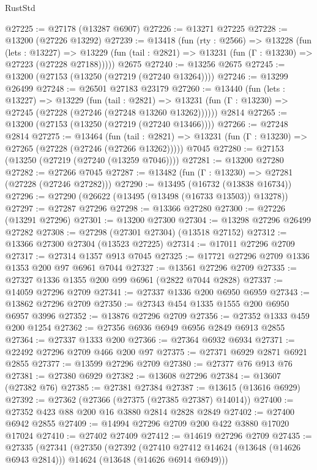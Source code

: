 \begin{lexlean}{RustStd}
\begin{coremodule}
@27225 := @27178 (@13287 @6907)
@27226 := @13271 @27225
@27228 := @13200 (@27226 @13292)
@27239 := @13418
    (fun (rty : @2566) =>
    @13228
      (fun (lets : @13227) =>
      @13229 (fun (tail : @2821) => @13231 (fun (Γ : @13230) => @27223 (@27228 @27188)))))
    @2675
@27240 := @13256 @2675
@27245 := @13200 (@27153 (@13250 (@27219 (@27240 @13264))))
@27246 := @13299 @26499
@27248 := @26501 @27183 @23179
@27260 := @13440
    (fun (lets : @13227) =>
    @13229
      (fun (tail : @2821) =>
      @13231 (fun (Γ : @13230) => @27245 (@27228 (@27246 (@27248 @13260 @13262))))))
    @2814
@27265 := @13200 (@27153 (@13250 (@27219 (@27240 @13466))))
@27266 := @27248 @2814
@27275 := @13464
    (fun (tail : @2821) => @13231 (fun (Γ : @13230) => @27265 (@27228 (@27246 (@27266 @13262)))))
    @7045
@27280 := @27153 (@13250 (@27219 (@27240 (@13259 @7046))))
@27281 := @13200 @27280
@27282 := @27266 @7045
@27287 := @13482 (fun (Γ : @13230) => @27281 (@27228 (@27246 @27282)))
@27290 := @13495 (@16732 (@13838 @16734))
@27296 := @27290 (@26622 (@13495 (@13498 (@16733 @13503)) @13278))
@27297 := @27287 @27296
@27298 := @13366 @27280
@27300 := @27226 (@13291 @27296)
@27301 := @13200 @27300
@27304 := @13298 @27296 @26499 @27282
@27308 := @27298 (@27301 @27304) (@13518 @27152)
@27312 := @13366 @27300 @27304 (@13523 @27225)
@27314 := @17011 @27296 @2709
@27317 := @27314 @1357 @913 @7045
@27325 := @17721 @27296 @2709 @1336 @1353 @200 @97 @6961 @7044
@27327 := @13561 @27296 @2709
@27335 := @27327 @1336 @1355 @200 @99 @6961 (@2822 @7044 @2828)
@27337 := @14059 @27296 @2709
@27341 := @27337 @1336 @200 @6950 @6959
@27343 := @13862 @27296 @2709
@27350 := @27343 @454 @1335 @1555 @200 @6950 @6957 @3996
@27352 := @13876 @27296 @2709
@27356 := @27352 @1333 @459 @200 @1254
@27362 := @27356 @6936 @6949 @6956 @2849 @6913 @2855
@27364 := @27337 @1333 @200
@27366 := @27364 @6932 @6934
@27371 := @22492 @27296 @2709 @466 @200 @97
@27375 := @27371 @6929 @2871 @6921 @2855
@27377 := @13599 @27296 @2709
@27380 := @27377 @76 @913 @76
@27381 := @27380 @6929
@27382 := @13608 @27296
@27384 := @13607 (@27382 @76)
@27385 := @27381 @27384
@27387 := @13615 (@13616 @6929)
@27392 := @27362 (@27366 (@27375 (@27385 @27387) @14014))
@27400 := @27352 @423 @88 @200 @16 @3880 @2814 @2828 @2849
@27402 := @27400 @6942 @2855
@27409 := @14994 @27296 @2709 @200 @422 @3880 @17020 @17024
@27410 := @27402 @27409
@27412 := @14619 @27296 @2709
@27435 := @27335
    (@27341
      (@27350
        (@27392
          (@27410 @27412 @14624 (@13648 (@14626 @6943 @2814)))
          @14624
          (@13648 (@14626 @6914 @6949)))

\end{coremodule}
\end{lexlean}
